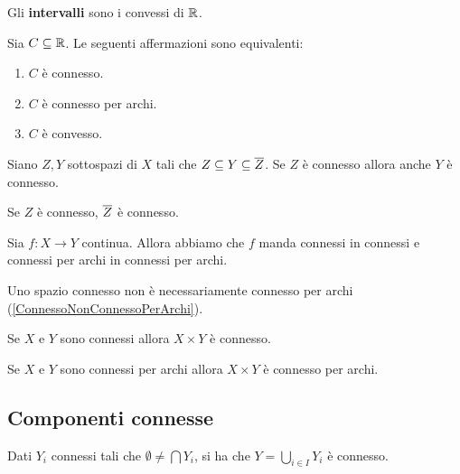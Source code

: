 \begin{multicols*}{2}
\begin{definition}[Intervallo]
Gli \textbf{intervalli} sono i convessi di $\R$.
\end{definition}

\begin{theorem}[Connessi su $\R$]\label{ConnessoConnessoPerArchiEConvessoCoincidonoSuR}
Sia $C\subseteq \mathbb{R}$. Le seguenti affermazioni sono equivalenti:
\begin{enumerate}[noitemsep]
\item $C$ è connesso.
\item $C$ è connesso per archi.
\item $C$ è convesso.
\end{enumerate}
\end{theorem}

\begin{proposition}\label{SeDensoConnessoSpazioConnesso}
Siano $Z,Y$ sottospazi di $X$ tali che $Z\subseteq Y\subseteq \overline{Z}$. Se $Z$ è connesso allora anche $Y$ è connesso.
\end{proposition}
\begin{corollary}
Se $Z$ è connesso, $\overline{Z}$ è connesso.
\end{corollary}

\begin{proposition}\label{ContinuePreservanoConnessione}
Sia $f:X\to Y$ continua. Allora abbiamo che $f$ manda connessi in connessi e connessi per archi in connessi per archi.
\end{proposition}

\begin{remark}
Uno spazio connesso non è necessariamente connesso per archi (\ref{ConnessoNonConnessoPerArchi}).
\end{remark}

\begin{theorem}\label{ProdottoFinitoDiConnessiEConnesso}
Se $X$ e $Y$ sono connessi allora $X\times Y$ è connesso.
\end{theorem}

\begin{theorem}\label{ProdottoFinitoDiConnessiPerArchiEConnessoPerArchi}
Se $X$ e $Y$ sono connessi per archi allora $X\times Y$ è connesso per archi.
\end{theorem}


\subsection{Componenti connesse}
\begin{proposition}\label{UnioneDiConnessiCheSiIntersecanoEConnessa}
Dati $Y_i$ connessi tali che $\emptyset\neq \bigcap Y_i$, si ha che $Y=\bigcup_{i\in I}Y_i$ è connesso.
\end{proposition}


\end{multicols*}
